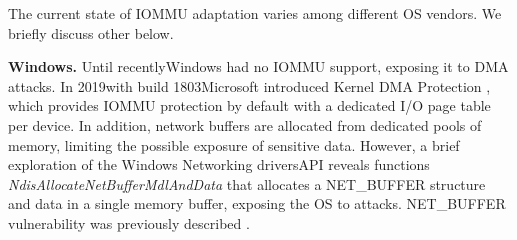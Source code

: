 
The current state of IOMMU adaptation varies among different OS vendors. We briefly discuss other \DIFdelbegin {}\DIFdelend \DIFaddbegin {}\DIFaddend below.

\smallskip
\noindent\textbf{Windows.} Until recently\DIFdelbegin {}\DIFdelend \DIFaddbegin \DIFadd{, }\DIFaddend Windows had no IOMMU support, exposing it to \simple DMA attacks.
In 2019\DIFdelbegin \DIFdel{(}\DIFdelend \DIFaddbegin \DIFadd{, }\DIFaddend with build 1803\DIFdelbegin \DIFdel{) }\DIFdelend \DIFaddbegin \DIFadd{, }\DIFaddend Microsoft introduced Kernel DMA Protection \cite{ms_iommu}, which provides IOMMU protection by default with a dedicated I/O page table per device. 
In addition, network buffers are allocated from dedicated pools of memory, limiting the possible exposure of sensitive data. However, a brief exploration of the Windows Networking drivers\DIFaddbegin {}\DIFaddend API reveals functions \DIFdelbegin {}\DIFdelend \DIFaddbegin {}\DIFaddend \emph{NdisAllocateNetBufferMdlAndData} \cite{ms_single} that allocates a NET\_BUFFER structure and data in a single memory buffer, exposing the OS to \simple attacks. 
\DIFdelbegin {}\DIFdelend \DIFaddbegin {}\DIFaddend NET\_BUFFER vulnerability was previously described \DIFaddbegin {}\DIFaddend \cite{thunder}. 

